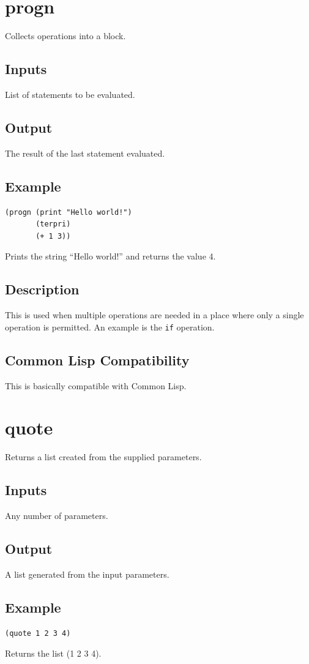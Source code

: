 \documentclass[10pt, openany]{book}
\newcommand{\keyword}[1]{\texttt{#1}}
\newcommand{\cl}{Common Lisp}
\begin{document}
\section{progn}
Collects operations into a block.
\subsection{Inputs}
List of statements to be evaluated.
\subsection{Output}
The result of the last statement evaluated.
\subsection{Example}
\begin{lstlisting}
(progn (print "Hello world!")
       (terpri)
       (+ 1 3))
\end{lstlisting}
Prints the string ``Hello world!'' and returns the value 4.
\subsection{Description}
This is used when multiple operations are needed in a place where only a single operation is permitted.  An example is the \keyword{if} operation.
\subsection{Common Lisp Compatibility}
This is basically compatible with \cl.

\section{quote}
Returns a list created from the supplied parameters.
\subsection{Inputs}
Any number of parameters.
\subsection{Output}
A list generated from the input parameters.
\subsection{Example}
\begin{lstlisting}
(quote 1 2 3 4)
\end{lstlisting}
Returns the list (1 2 3 4).
\end{document}
